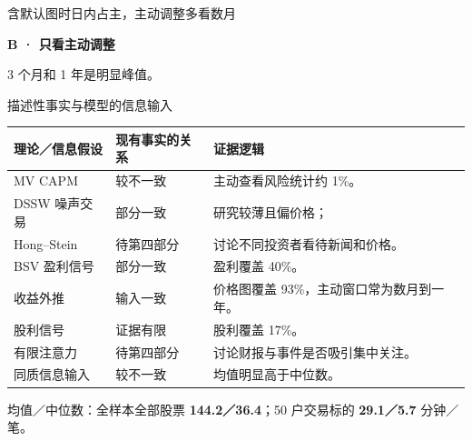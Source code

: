 \begin{frame}[label=windows]{含默认图时日内占主，主动调整多看数月}
  {\small\textbf{B · 只看主动调整}\par
    \par
    {\small 3 个月和 1 年是明显峰值。}}
\end{frame}

\begin{frame}[label=averages]{描述性事实与模型的信息输入}
  \footnotesize
  \setlength{\tabcolsep}{3pt}
  \renewcommand{\arraystretch}{1.06}
  \begin{tabularx}{\linewidth}{@{}L{.26\linewidth}L{.18\linewidth}Y@{}}
    \toprule 理论／信息假设 & 现有事实的关系 & 证据逻辑\\\midrule
    MV CAPM & 较不一致 & 主动查看风险统计约 1\%。\\
    DSSW 噪声交易 & 部分一致 & 研究较薄且偏价格；\\
    Hong--Stein & 待第四部分 & 讨论不同投资者看待新闻和价格。\\
    BSV 盈利信号 & 部分一致 & 盈利覆盖 40\%。\\
    收益外推 & 输入一致 & 价格图覆盖 93\%，主动窗口常为数月到一年。\\
    股利信号 & 证据有限 & 股利覆盖 17\%。\\
    有限注意力 & 待第四部分 & 讨论财报与事件是否吸引集中关注。\\
    同质信息输入 & 较不一致 & 均值明显高于中位数。\\
    \bottomrule
  \end{tabularx}
  \smallskip
  {\small 均值／中位数：全样本全部股票 \textbf{144.2／36.4}；50 户交易标的 \textbf{29.1／5.7} 分钟／笔。}
\end{frame}
